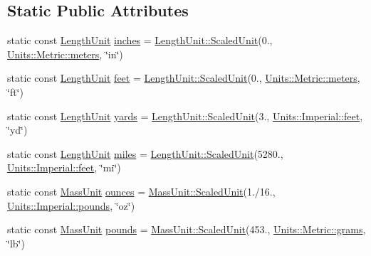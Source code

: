 \subsection*{Static Public Attributes}
\begin{DoxyCompactItemize}
\item 
static const \hyperlink{_quantity_8h_afb62d6d68e6cd2c62c96aa8c3aeb7d1f}{Length\+Unit} \hyperlink{class_units_1_1_imperial_ab94938e29c6ad2bfd28576401a580fc7}{inches} = \hyperlink{class_unit_aa44ac3044c0cdb834cd220652e5d1c40}{Length\+Unit\+::\+Scaled\+Unit}(0., \hyperlink{class_units_1_1_metric_a74b4e02c4b56750866bb289784d964ba}{Units\+::\+Metric\+::meters}, \char`\"{}in\char`\"{})
\item 
static const \hyperlink{_quantity_8h_afb62d6d68e6cd2c62c96aa8c3aeb7d1f}{Length\+Unit} \hyperlink{class_units_1_1_imperial_aa9b2921928f73582aec2467ba60bb625}{feet} = \hyperlink{class_unit_aa44ac3044c0cdb834cd220652e5d1c40}{Length\+Unit\+::\+Scaled\+Unit}(0., \hyperlink{class_units_1_1_metric_a74b4e02c4b56750866bb289784d964ba}{Units\+::\+Metric\+::meters}, \char`\"{}ft\char`\"{})
\item 
static const \hyperlink{_quantity_8h_afb62d6d68e6cd2c62c96aa8c3aeb7d1f}{Length\+Unit} \hyperlink{class_units_1_1_imperial_ae2bee79b25bd5888d7e6b454a057cb66}{yards} = \hyperlink{class_unit_aa44ac3044c0cdb834cd220652e5d1c40}{Length\+Unit\+::\+Scaled\+Unit}(3., \hyperlink{class_units_1_1_imperial_aa9b2921928f73582aec2467ba60bb625}{Units\+::\+Imperial\+::feet}, \char`\"{}yd\char`\"{})
\item 
static const \hyperlink{_quantity_8h_afb62d6d68e6cd2c62c96aa8c3aeb7d1f}{Length\+Unit} \hyperlink{class_units_1_1_imperial_a3ccc983d656c0b984f7b269d6e6c3625}{miles} = \hyperlink{class_unit_aa44ac3044c0cdb834cd220652e5d1c40}{Length\+Unit\+::\+Scaled\+Unit}(5280., \hyperlink{class_units_1_1_imperial_aa9b2921928f73582aec2467ba60bb625}{Units\+::\+Imperial\+::feet}, \char`\"{}mi\char`\"{})
\item 
static const \hyperlink{_quantity_8h_a2dde25127542e6a5fcf7c085269b8963}{Mass\+Unit} \hyperlink{class_units_1_1_imperial_af866267c1b81518be69261c840d1e201}{ounces} = \hyperlink{class_unit_aa44ac3044c0cdb834cd220652e5d1c40}{Mass\+Unit\+::\+Scaled\+Unit}(1./16., \hyperlink{class_units_1_1_imperial_a25954e93175ecbf7c8dcc870e6c01dd4}{Units\+::\+Imperial\+::pounds}, \char`\"{}oz\char`\"{})
\item 
static const \hyperlink{_quantity_8h_a2dde25127542e6a5fcf7c085269b8963}{Mass\+Unit} \hyperlink{class_units_1_1_imperial_a25954e93175ecbf7c8dcc870e6c01dd4}{pounds} = \hyperlink{class_unit_aa44ac3044c0cdb834cd220652e5d1c40}{Mass\+Unit\+::\+Scaled\+Unit}(453., \hyperlink{class_units_1_1_metric_a88cdf60341e6f6d7013018cdc1c26ec6}{Units\+::\+Metric\+::grams}, \char`\"{}lb\char`\"{})

\end{DoxyCompactItemize}
